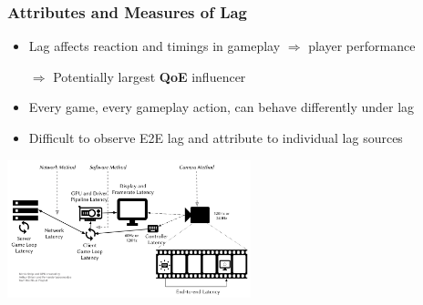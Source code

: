 \documentclass{UDEbeamerEN}
\begin{document}
\begin{frame}
	\frametitle{Attributes and Measures of Lag}

	\begin{itemize}
		\item Lag affects reaction and timings in gameplay $\Rightarrow$ player performance
		\item[$\Rightarrow$] Potentially largest \textbf{QoE} influencer
		\item Every game, every gameplay action, can behave differently under lag
		\item Difficult to observe E2E lag and attribute to individual lag sources
	\end{itemize}

	\pause
	\begin{center}
		\vspace{-2mm}

		\includegraphics[height=4cm]{../../../models/e2e-lag.pdf}
	\end{center}

\end{frame}
\end{document}
